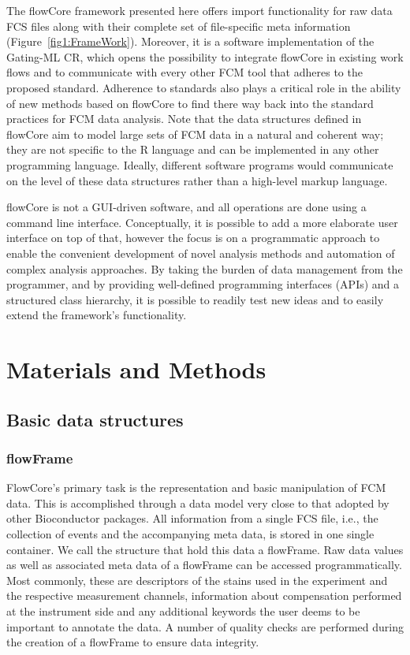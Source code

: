 \documentclass[12pt]{article}
\begin{document}
The flowCore framework presented here offers import functionality for
raw data FCS files along with their complete set of file-specific meta
information (Figure~\ref{fig1:FrameWork}). Moreover, it is a software
implementation of the Gating-ML CR, which opens the possibility to
integrate flowCore in existing work flows and to communicate with every
other FCM tool that adheres to the proposed standard. Adherence to
standards also plays a critical role in the ability of new methods
based on flowCore to find there way back into the standard practices
for FCM data analysis. Note that the data structures defined in
flowCore aim to model large sets of FCM data in a natural and coherent
way; they are not specific to the R language and can be implemented in
any other programming language. Ideally, different software programs
would communicate on the level of these data structures rather than a
high-level markup language.

flowCore is not a GUI-driven software, and all operations are done
using a command line interface. Conceptually, it is possible to add a
more elaborate user interface on top of that, however the focus is on
a programmatic approach to enable the convenient development of novel
analysis methods and automation of complex analysis approaches. By
taking the burden of data management from the programmer, and by
providing well-defined programming interfaces (APIs) and a structured
class hierarchy, it is possible to readily test new ideas and to
easily extend the framework's functionality.



\section*{Materials and Methods}
\subsection*{Basic data structures}
\subsubsection*{flowFrame}
FlowCore's primary task is the representation and basic manipulation
of FCM data. This is accomplished through a data model very close to
that adopted by other Bioconductor packages. All information from a
single FCS file, i.e., the collection of events and the accompanying
meta data, is stored in one single container. We call the structure
that hold this data a flowFrame. Raw data values as well as associated
meta data of a flowFrame can be accessed programmatically. Most
commonly, these are descriptors of the stains used in the experiment
and the respective measurement channels, information about
compensation performed at the instrument side and any additional
keywords the user deems to be important to annotate the data. A number
of quality checks are performed during the creation of a flowFrame to
ensure data integrity.
\end{document}
